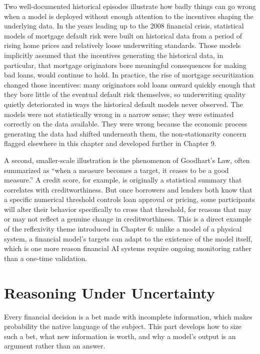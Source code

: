 \documentclass[../ai_in_finance]{subfiles}
\begin{document}
Two well-documented historical episodes illustrate how badly things can go wrong when a model is deployed without enough attention to the incentives shaping the underlying data. In the years leading up to the 2008 financial crisis, statistical models of mortgage default risk were built on historical data from a period of rising home prices and relatively loose underwriting standards. Those models implicitly assumed that the incentives generating the historical data, in particular, that mortgage originators bore meaningful consequences for making bad loans, would continue to hold. In practice, the rise of mortgage securitization changed those incentives: many originators sold loans onward quickly enough that they bore little of the eventual default risk themselves, so underwriting quality quietly deteriorated in ways the historical default models never observed.
The models were not statistically wrong in a narrow sense; they were estimated correctly on the data available. They were wrong because the economic process generating the data had shifted underneath them, the non-stationarity concern flagged elsewhere in this chapter and developed further in Chapter 9.

A second, smaller-scale illustration is the phenomenon of Goodhart's Law, often summarized as ``when a measure becomes a target, it ceases to be a good measure.'' A credit score, for example, is originally a statistical summary that correlates with creditworthiness. But once borrowers and lenders both know that a specific numerical threshold controls loan approval or pricing, some participants will alter their behavior specifically to cross that threshold, for reasons that may or may not reflect a genuine change in creditworthiness. This is a direct example of the reflexivity theme introduced in Chapter 6: unlike a model of a physical system, a financial model's targets can adapt to the existence of the model itself, which is one more reason financial AI systems require ongoing monitoring rather than a one-time validation.

\section{Reasoning Under Uncertainty}

Every financial decision is a bet made with incomplete information, which makes probability the native language of the subject. This part develops how to size such a bet, what new information is worth, and why a model's output is an argument rather than an answer.
\end{document}

